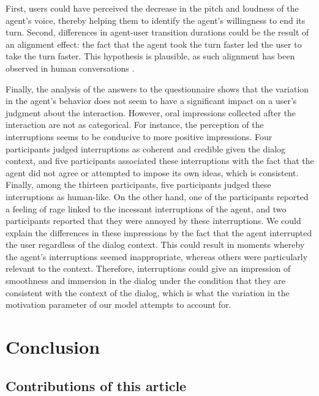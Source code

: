 \documentclass[twocolumn]{svjour3}
\begin{document}
First, users could have perceived the decrease in the pitch and loudness of the agent's voice, thereby helping them to identify the agent's willingness to end its turn. 
Second, differences in agent-user transition durations could be the result of an alignment effect: the fact that the agent took the turn faster led the user to take the turn faster. This hypothesis is plausible, as such alignment has been observed in human conversations \citep{levitan_entrainment_2015}.  

Finally, the analysis of the answers to the questionnaire shows that the variation in the agent's behavior does not seem to have a significant impact on a user's judgment about the interaction. 
However, oral impressions collected after the interaction are not as categorical.   
For instance, the perception of the interruptions seems to be conducive to more positive impressions. Four participants judged interruptions as coherent and credible given the dialog context, and five participants associated these interruptions with the fact that the agent did not agree or attempted to impose its own ideas, which is consistent. 
Finally, among the thirteen participants, five participants judged these interruptions as human-like. On the other hand, one of the participants reported a feeling of rage linked to the incessant interruptions of the agent, and two participants reported that they were annoyed by these interruptions. We could explain the differences in these impressions by the fact that the agent interrupted the user regardless of the dialog context. This could result in moments whereby the agent's interruptions seemed inappropriate, whereas others were particularly relevant to the context. Therefore, interruptions could give an impression of smoothness and immersion in the dialog under the condition that they are consistent with the context of the dialog, which is what the variation in the motivation parameter of our model attempts to account for.

\section{Conclusion}

\subsection{Contributions of this article}
\end{document}
